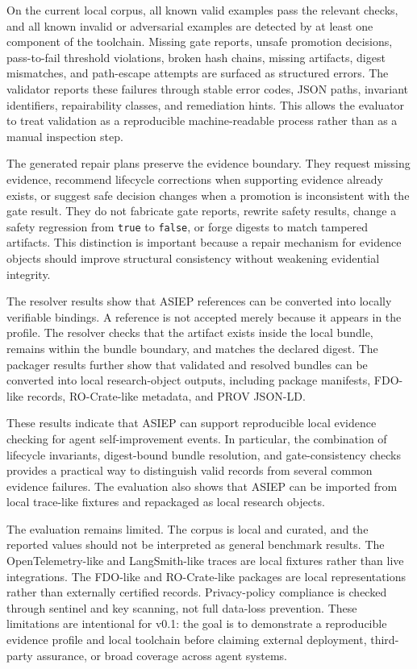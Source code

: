 On the current local corpus, all known valid examples pass the relevant checks, and all known invalid or adversarial examples are detected by at least one component of the toolchain. Missing gate reports, unsafe promotion decisions, pass-to-fail threshold violations, broken hash chains, missing artifacts, digest mismatches, and path-escape attempts are surfaced as structured errors. The validator reports these failures through stable error codes, JSON paths, invariant identifiers, repairability classes, and remediation hints. This allows the evaluator to treat validation as a reproducible machine-readable process rather than as a manual inspection step.

The generated repair plans preserve the evidence boundary. They request missing evidence, recommend lifecycle corrections when supporting evidence already exists, or suggest safe decision changes when a promotion is inconsistent with the gate result. They do not fabricate gate reports, rewrite safety results, change a safety regression from \texttt{true} to \texttt{false}, or forge digests to match tampered artifacts. This distinction is important because a repair mechanism for evidence objects should improve structural consistency without weakening evidential integrity.

The resolver results show that ASIEP references can be converted into locally verifiable bindings. A reference is not accepted merely because it appears in the profile. The resolver checks that the artifact exists inside the local bundle, remains within the bundle boundary, and matches the declared digest. The packager results further show that validated and resolved bundles can be converted into local research-object outputs, including package manifests, FDO-like records, RO-Crate-like metadata, and PROV JSON-LD.

These results indicate that ASIEP can support reproducible local evidence checking for agent self-improvement events. In particular, the combination of lifecycle invariants, digest-bound bundle resolution, and gate-consistency checks provides a practical way to distinguish valid records from several common evidence failures. The evaluation also shows that ASIEP can be imported from local trace-like fixtures and repackaged as local research objects.

The evaluation remains limited. The corpus is local and curated, and the reported values should not be interpreted as general benchmark results. The OpenTelemetry-like and LangSmith-like traces are local fixtures rather than live integrations. The FDO-like and RO-Crate-like packages are local representations rather than externally certified records. Privacy-policy compliance is checked through sentinel and key scanning, not full data-loss prevention. These limitations are intentional for v0.1: the goal is to demonstrate a reproducible evidence profile and local toolchain before claiming external deployment, third-party assurance, or broad coverage across agent systems.
